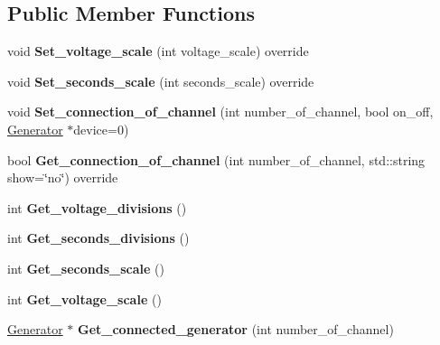 \subsection*{Public Member Functions}
\begin{DoxyCompactItemize}
\item 
\mbox{\label{class_oscilloscope_aed822fbdd0d5cb212d99f8862d0b1fa4}} 
void {\bfseries Set\+\_\+voltage\+\_\+scale} (int voltage\+\_\+scale) override
\item 
\mbox{\label{class_oscilloscope_aafefc9f82570b220290cad143778e698}} 
void {\bfseries Set\+\_\+seconds\+\_\+scale} (int seconds\+\_\+scale) override
\item 
\mbox{\label{class_oscilloscope_ac1f804ec3dd1bedeeec8917e81402d01}} 
void {\bfseries Set\+\_\+connection\+\_\+of\+\_\+channel} (int number\+\_\+of\+\_\+channel, bool on\+\_\+off, \mbox{\hyperlink{class_generator}{Generator}} $\ast$device=0)
\item 
\mbox{\label{class_oscilloscope_abd69b5b74a48b2e4c47fe055a0b07939}} 
bool {\bfseries Get\+\_\+connection\+\_\+of\+\_\+channel} (int number\+\_\+of\+\_\+channel, std\+::string show=\char`\"{}no\char`\"{}) override
\item 
\mbox{\label{class_oscilloscope_af1267bd06fd7d13c9a2badf78ebf736f}} 
int {\bfseries Get\+\_\+voltage\+\_\+divisions} ()
\item 
\mbox{\label{class_oscilloscope_a812a52b72d06f83b61cd7f66a3fdb05f}} 
int {\bfseries Get\+\_\+seconds\+\_\+divisions} ()
\item 
\mbox{\label{class_oscilloscope_a20a96d500e3a4eccd0fedecc01b78e6f}} 
int {\bfseries Get\+\_\+seconds\+\_\+scale} ()
\item 
\mbox{\label{class_oscilloscope_ae53ba8e9e38e06de5c698fbd95b254a7}} 
int {\bfseries Get\+\_\+voltage\+\_\+scale} ()
\item 
\mbox{\label{class_oscilloscope_a87eddddda0808c1adf7a90dc4d229098}} 
\mbox{\hyperlink{class_generator}{Generator}} $\ast$ {\bfseries Get\+\_\+connected\+\_\+generator} (int number\+\_\+of\+\_\+channel)
\end{DoxyCompactItemize}
